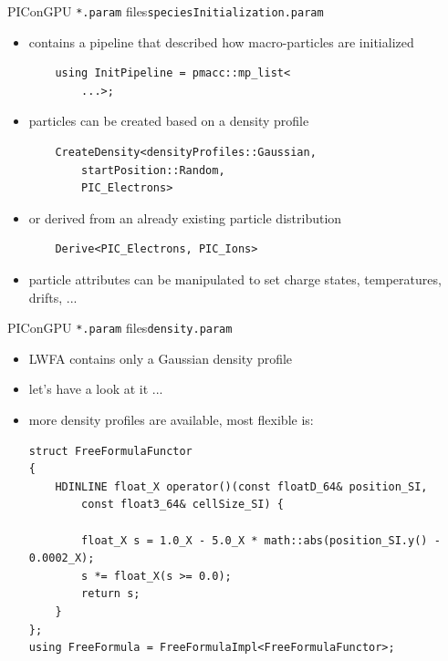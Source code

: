 \documentclass[
  aspectratio=169,
  10pt
]{beamer}
\begin{document}
\begin{frame}[t,fragile]{PIConGPU \texttt{*.param} files}{\texttt{speciesInitialization.param}}

\begin{itemize}
    \item contains a pipeline that described how macro-particles are initialized
    \begin{verbatim}
    using InitPipeline = pmacc::mp_list<
        ...>;
    \end{verbatim}
    \item particles can be created based on a density profile
    \begin{verbatim}
    CreateDensity<densityProfiles::Gaussian, 
        startPosition::Random, 
        PIC_Electrons>
    \end{verbatim} 
    \item or derived from an already existing particle distribution
    \begin{verbatim}
    Derive<PIC_Electrons, PIC_Ions>
    \end{verbatim} 
    \item particle attributes can be manipulated to set charge states, temperatures, drifts, ...

\end{itemize}

\end{frame}



\begin{frame}[t,fragile]{PIConGPU \texttt{*.param} files}{\texttt{density.param}}

\begin{itemize}
    \item LWFA contains only a Gaussian density profile
    \item let's have a look at it ...
    \item more density profiles are available, most flexible is: 
\begin{verbatim}
struct FreeFormulaFunctor
{
    HDINLINE float_X operator()(const floatD_64& position_SI, 
        const float3_64& cellSize_SI) {

        float_X s = 1.0_X - 5.0_X * math::abs(position_SI.y() - 0.0002_X);
        s *= float_X(s >= 0.0);
        return s;
    }
};
using FreeFormula = FreeFormulaImpl<FreeFormulaFunctor>;    
\end{verbatim}

\end{itemize}

\end{frame}
\end{document}
